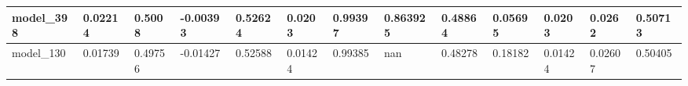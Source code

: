 \begin{tabular}{|l|l|l|l|l|l|l|l|l|l|l|l|l|}
model\_398     & 0.02214     & 0.5008         & -0.00393     & 0.52624          & 0.0203               & 0.99397              & 0.863925     & 0.48864           & 0.05695            & 0.0203          & 0.0262      & 0.50713      \\ \hline
model\_130     & 0.01739     & 0.49756        & -0.01427     & 0.52588          & 0.01424              & 0.99385              & nan          & 0.48278           & 0.18182            & 0.01424         & 0.02607     & 0.50405      \\ \hline
\end{tabular}